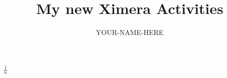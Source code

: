 \documentclass{xourse}
\title{My new Ximera Activities}
\author{YOUR-NAME-HERE}
\begin{document}
\begin{abstract}
\end{abstract}
\maketitle

$\frac{1}{n}$
\end{document}
